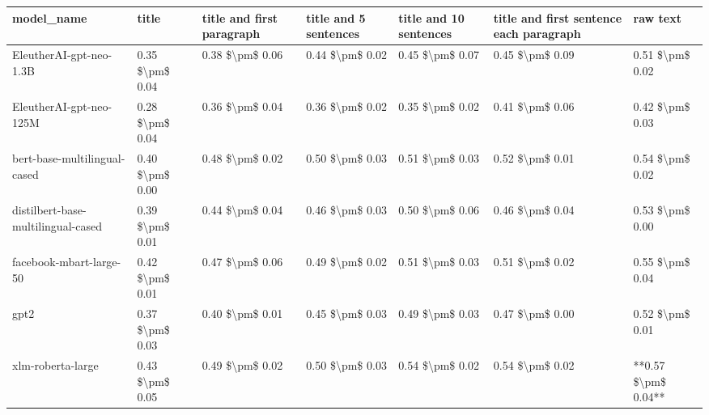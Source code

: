 \begin{tabular}{lllllll}
\toprule
                        model\_name &           title & title and first paragraph & title and 5 sentences & title and 10 sentences & title and first sentence each paragraph &            raw text \\
\midrule
           EleutherAI-gpt-neo-1.3B & 0.35 \$\textbackslash pm\$ 0.04 &           0.38 \$\textbackslash pm\$ 0.06 &       0.44 \$\textbackslash pm\$ 0.02 &        0.45 \$\textbackslash pm\$ 0.07 &                         0.45 \$\textbackslash pm\$ 0.09 &     0.51 \$\textbackslash pm\$ 0.02 \\
           EleutherAI-gpt-neo-125M & 0.28 \$\textbackslash pm\$ 0.04 &           0.36 \$\textbackslash pm\$ 0.04 &       0.36 \$\textbackslash pm\$ 0.02 &        0.35 \$\textbackslash pm\$ 0.02 &                         0.41 \$\textbackslash pm\$ 0.06 &     0.42 \$\textbackslash pm\$ 0.03 \\
      bert-base-multilingual-cased & 0.40 \$\textbackslash pm\$ 0.00 &           0.48 \$\textbackslash pm\$ 0.02 &       0.50 \$\textbackslash pm\$ 0.03 &        0.51 \$\textbackslash pm\$ 0.03 &                         0.52 \$\textbackslash pm\$ 0.01 &     0.54 \$\textbackslash pm\$ 0.02 \\
distilbert-base-multilingual-cased & 0.39 \$\textbackslash pm\$ 0.01 &           0.44 \$\textbackslash pm\$ 0.04 &       0.46 \$\textbackslash pm\$ 0.03 &        0.50 \$\textbackslash pm\$ 0.06 &                         0.46 \$\textbackslash pm\$ 0.04 &     0.53 \$\textbackslash pm\$ 0.00 \\
           facebook-mbart-large-50 & 0.42 \$\textbackslash pm\$ 0.01 &           0.47 \$\textbackslash pm\$ 0.06 &       0.49 \$\textbackslash pm\$ 0.02 &        0.51 \$\textbackslash pm\$ 0.03 &                         0.51 \$\textbackslash pm\$ 0.02 &     0.55 \$\textbackslash pm\$ 0.04 \\
                              gpt2 & 0.37 \$\textbackslash pm\$ 0.03 &           0.40 \$\textbackslash pm\$ 0.01 &       0.45 \$\textbackslash pm\$ 0.03 &        0.49 \$\textbackslash pm\$ 0.03 &                         0.47 \$\textbackslash pm\$ 0.00 &     0.52 \$\textbackslash pm\$ 0.01 \\
                 xlm-roberta-large & 0.43 \$\textbackslash pm\$ 0.05 &           0.49 \$\textbackslash pm\$ 0.02 &       0.50 \$\textbackslash pm\$ 0.03 &        0.54 \$\textbackslash pm\$ 0.02 &                         0.54 \$\textbackslash pm\$ 0.02 & **0.57 \$\textbackslash pm\$ 0.04** \\
\bottomrule
\end{tabular}
